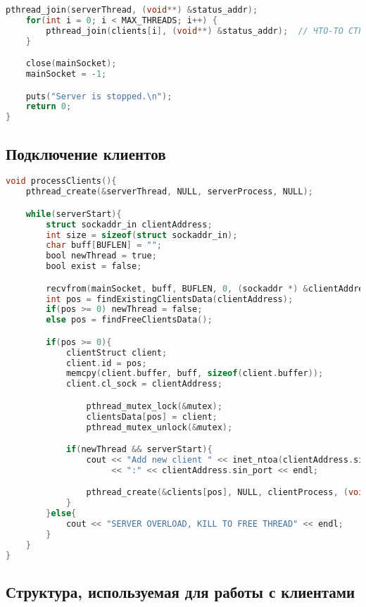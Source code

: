 \begin{append}
\begin{lstlisting}[language=C, label=lst:createserver]
    pthread_join(serverThread, (void**) &status_addr);
    for(int i = 0; i < MAX_THREADS; i++) {
        pthread_join(clients[i], (void**) &status_addr);  // ЧТО-ТО СТРАННОЕ
    }

    close(mainSocket);
    mainSocket = -1;

    puts("Server is stopped.\n");
    return 0;
}
\end{lstlisting}

\subsection{Подключение клиентов} \label{app:acceptconnectionsudp}

\begin{lstlisting}[language=C, label=lst:createserver]
void processClients(){
    pthread_create(&serverThread, NULL, serverProcess, NULL);

    while(serverStart){
        struct sockaddr_in clientAddress;
        int size = sizeof(struct sockaddr_in);
        char buff[BUFLEN] = "";
        bool newThread = true;
        bool exist = false;

        recvfrom(mainSocket, buff, BUFLEN, 0, (sockaddr *) &clientAddress, (socklen_t *) &size);
        int pos = findExistingClientsData(clientAddress);
        if(pos >= 0) newThread = false;
        else pos = findFreeClientsData();

        if(pos >= 0){
            clientStruct client;
            client.id = pos;
            memcpy(client.buffer, buff, sizeof(client.buffer));
            client.cl_sock = clientAddress;

                pthread_mutex_lock(&mutex);
                clientsData[pos] = client;
                pthread_mutex_unlock(&mutex);

            if(newThread && serverStart){
                cout << "Add new client " << inet_ntoa(clientAddress.sin_addr)
                     << ":" << clientAddress.sin_port << endl;

                pthread_create(&clients[pos], NULL, clientProcess, (void*) &pos);
            }
        }else{
            cout << "SERVER OVERLOAD, KILL TO FREE THREAD" << endl;
        }
    }
}
\end{lstlisting}

\subsection{Структура, используемая для работы с клиентами} \label{app:structudp}


\end{append}
